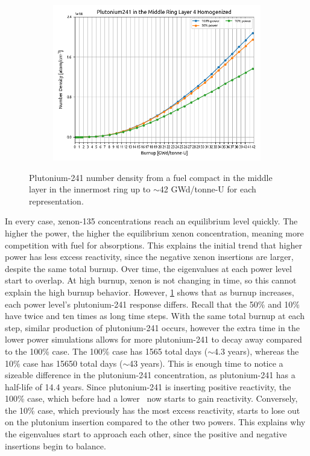 \documentclass[letterpaper]{physor2024}
\begin{document}
\begin{figure}[!h]
\begin{subfigure}{0.495\linewidth}
        \includegraphics[width=\linewidth]{figures/homogenized_Pu_241.png}
    \end{subfigure}
    \caption{Plutonium-241 number density from a fuel compact in the middle layer in the innermost ring up to $\sim$42 GWd/tonne-U for each representation.}
    \label{fig:plutoniums}
\end{figure}

In every case, xenon-135 concentrations reach an equilibrium level quickly. The higher the power, the higher the equilibrium xenon concentration, meaning more competition with fuel for absorptions. This explains the initial trend that higher power has less excess reactivity, since the negative xenon insertions are larger, despite the same total burnup. Over time, the eigenvalues at each power level start to overlap. At high burnup, xenon is not changing in time, so this cannot explain the high burnup behavior. However, \cref{fig:plutoniums} shows that as burnup increases, each power level's plutonium-241 response differs. Recall that the 50\% and 10\% have twice and ten times as long time steps. With the same total burnup at each step, similar production of plutonium-241 occurs, however the extra time in the lower power simulations allows for more plutonium-241 to decay away compared to the 100\% case. The 100\% case has 1565 total days ($\sim$4.3 years), whereas the 10\% case has 15650 total days ($\sim$43 years). This is enough time to notice a sizeable difference in the plutonium-241 concentration, as plutonium-241 has a half-life of 14.4 years. Since plutonium-241 is inserting positive reactivity, the 100\% case, which before had a lower \kinf~now starts to gain reactivity. Conversely, the 10\% case, which previously has the most excess reactivity, starts to lose out on the plutonium insertion compared to the other two powers. This explains why the eigenvalues start to approach each other, since the positive and negative insertions begin to balance.
\end{document}

